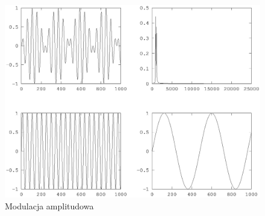 \documentclass[11pt,a4paper]{article}
\begin{document}
\begin{enumerate}
\begin{figure}
\includegraphics[scale=0.8]{proba3_dom}
\caption{Modulacja amplitudowa}
\label{fig:5}
\end{figure}
\end{enumerate}
\end{document}
